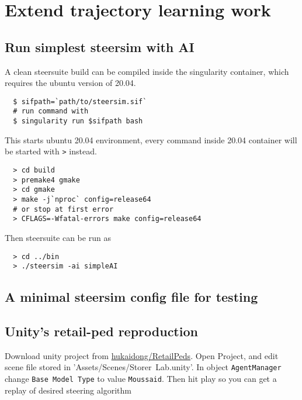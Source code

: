 \chapter{Extend trajectory learning work}

\section{Run simplest steersim with AI} %

A clean steersuite build can be compiled inside the singularity container, 
which requires the ubuntu version of 20.04.

\begin{verbatim}
  $ sifpath=`path/to/steersim.sif`
  # run command with
  $ singularity run $sifpath bash
\end{verbatim}

This starts ubuntu 20.04 environment, every command inside 20.04 container will 
be started with \texttt{>} instead.

\begin{verbatim}
  > cd build
  > premake4 gmake
  > cd gmake
  > make -j`nproc` config=release64
  # or stop at first error
  > CFLAGS=-Wfatal-errors make config=release64
\end{verbatim}

Then steersuite can be run as
\begin{verbatim}
  > cd ../bin
  > ./steersim -ai simpleAI
\end{verbatim}

\section{A minimal steersim config file for testing}

\section{Unity's retail-ped reproduction} %

Download unity project from \href{ 
https://github.com/hukaidong/RetailPeds/tree/a46f14017152f101e3e420522edc3b41b4406dbc 
}{hukaidong/RetailPeds}. Open Project, and edit scene file stored in 
'Assets/Scenes/Storer~Lab.unity'. In object \texttt{AgentManager} 
change \texttt{Base Model Type} to value 
\texttt{Moussaid}. Then hit play so you can get a replay of desired 
steering algorithm \cite{moussaid2011how}
\printbibliography

